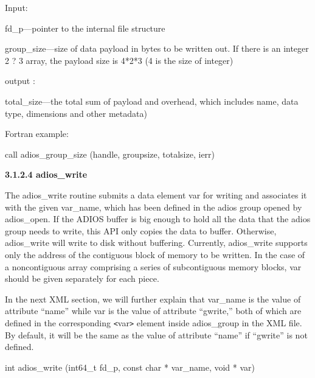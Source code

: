 \vspace{10pt}
Input: 

\vspace{10pt}
\leftskip=40pt
fd\_p---pointer to the internal file structure

\vspace{10pt}
group\_size---size of data payload in bytes to be written out. If there is an integer 
2 ? 3 array, the payload size is 4*2*3 (4 is the size of integer)

\vspace{10pt}
output :

\vspace{10pt}
total\_size---the total sum of payload and overhead, which includes name, data 
type, dimensions and other metadata)

\vspace{22pt}
\leftskip=22pt
Fortran example: 

\vspace{10pt}
\leftskip=40pt
call adios\_group\_size (handle, groupsize, totalsize, ierr)

\vspace{10pt}
\leftskip=0pt
\textbf{3.1.2.4 adios\_write}

\vspace{10pt}
The adios\_write routine submits a data element var for writing and associates 
it with the given var\_name, which has been defined in the adios group opened by 
adios\_open. If the ADIOS buffer is big enough to hold all the data that the adios 
group needs to write, this API only copies the data to buffer. Otherwise, adios\_write 
will write to disk without buffering. Currently, adios\_write supports only the 
address of the contiguous block of memory to be written. In the case of a noncontiguous 
array comprising a series of subcontiguous memory blocks, var should be given separately 
for each piece.

\vspace{10pt}
In the next XML section, we will further explain that var\_name is the value of 
attribute ``name'' while var is the value of attribute ``gwrite,'' both of which 
are defined in the corresponding \texttt{<}var\texttt{>} element inside adios\_group 
in the XML file. By default, it will be the same as the value of attribute ``name'' 
if ``gwrite'' is not defined. 

\vspace{10pt}
\leftskip=22pt
int adios\_write (int64\_t fd\_p, const char * var\_name, void * var)

